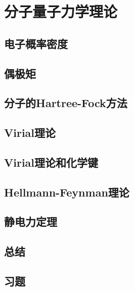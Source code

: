 \chapter{分子量子力学理论}
\label{chap:14}
\section{电子概率密度}
\label{sec:14.1 Electron Probability Density}

\section{偶极矩}
\label{sec:14.2 Dipole Moments}

\section{分子的Hartree-Fock方法}
\label{sec:14.3 The Hartree-Fock Method for Molecules}

\section{Virial理论}
\label{sec:14.4 The Virial Theorem}

\section{Virial理论和化学键}
\label{sec:14.5 The Virial Theorem and Chemical Bonding}

\section{Hellmann-Feynman理论}
\label{sec:14.6 The Hellmann-Feynman Theorem}

\section{静电力定理}
\label{sec:14.7 The Electrostatic Theorem}

\section*{总结}

\section*{习题}